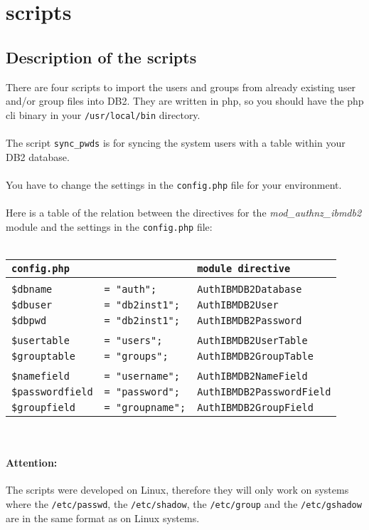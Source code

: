\section{scripts}
\subsection{Description of the scripts}
There are four scripts to import the users and groups from already existing user and/or group files into DB2. They are written in php, so you should have the php cli binary in your {\tt /usr/local/bin} directory.\\
\\
The script {\tt sync\_pwds} is for syncing the system users with a table within your DB2 database.\\
\\
You have to change the settings in the {\tt config.php} file for your environment.\\
\\
Here is a table of the relation between the directives for the \emph{mod\_authnz\_ibmdb2} module
and the settings in the {\tt config.php} file:\\
\\
\begin{tabular}{@{} lll @{}}
{\tt config.php} & & {\tt module directive}\\
\hline
& & \\
{\tt \$dbname} & {\tt = "auth";} & {\tt AuthIBMDB2Database} \\
{\tt \$dbuser} & {\tt = "db2inst1";} & {\tt AuthIBMDB2User} \\
{\tt \$dbpwd} & {\tt = "db2inst1";} & {\tt AuthIBMDB2Password} \\
& & \\
{\tt \$usertable} & {\tt = "users";} & {\tt AuthIBMDB2UserTable} \\
{\tt \$grouptable} & {\tt = "groups";} & {\tt AuthIBMDB2GroupTable} \\
& & \\
{\tt \$namefield} & {\tt = "username";} & {\tt AuthIBMDB2NameField} \\
{\tt \$passwordfield} & {\tt = "password";} & {\tt AuthIBMDB2PasswordField} \\
{\tt \$groupfield} & {\tt = "groupname";} & {\tt AuthIBMDB2GroupField} \\
\end{tabular}
\\
\paragraph{Attention:}{The scripts were developed on Linux, therefore they will only work on systems where the {\tt /etc/passwd}, the {\tt /etc/shadow}, the {\tt /etc/group} and the {\tt /etc/gshadow} are in the same format as on Linux systems.}
